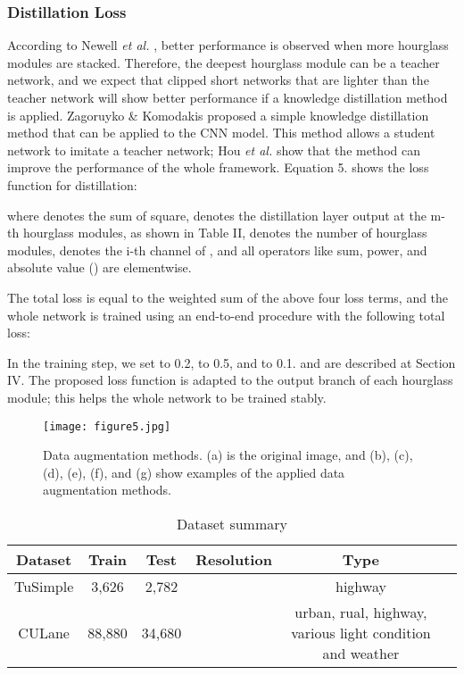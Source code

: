 \documentclass[journal]{IEEEtran}
\begin{document}
\subsubsection{Distillation Loss}
According to Newell \textit{et al.} \cite{newell2016stacked}, better performance is observed when more hourglass modules are stacked. Therefore, the deepest hourglass module can be a teacher network, and we expect that clipped short networks that are lighter than the teacher network will show better performance if a knowledge distillation method is applied. Zagoruyko \& Komodakis \cite{zagoruyko2016paying} proposed a simple knowledge distillation method that can be applied to the CNN model. This method allows a student network to imitate a teacher network; Hou \textit{et al.} \cite{hou2019learning} show that the method can improve the performance of the whole framework. Equation 5. shows the loss function for distillation:



where  denotes the sum of square,  denotes the distillation layer output at the m-th hourglass modules, as shown in Table II,  denotes the number of hourglass modules,  denotes the i-th channel of , and all operators like sum, power, and absolute value () are elementwise.

The total loss  is equal to the weighted sum of the above four loss terms, and the whole network is trained using an end-to-end procedure with the following total loss:

In the training step, we set  to 0.2,  to 0.5, and  to 0.1.  and  are described at Section IV. The proposed loss function is adapted to the output branch of each hourglass module; this helps the whole network to be trained stably.

\begin{figure}
    \centering
    \texttt{[image: figure5.jpg]}
    \caption{Data augmentation methods. (a) is the original image, and (b), (c), (d), (e), (f), and (g) show examples of the applied data augmentation methods.}
\end{figure}

\begin{table*}[ht]
    \caption{Dataset summary}
    \begin{center}
        \begin{tabular}{|c|c|c|c|c|c|}
            \hline
            Dataset & Train & Test & Resolution & Type \\
            \hline
            \hline
            TuSimple & 3,626 & 2,782 &  & highway \\
            \hline
            CULane & 88,880 & 34,680 &  & urban, rual, highway, various light condition and weather \\
            \hline
        \end{tabular}
    \end{center}
\end{table*}
\end{document}
